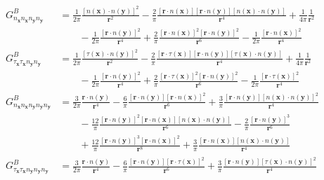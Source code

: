 \documentclass[preprint,12pt,3p]{elsarticle}
\begin{document}
\begin{align}
    G^{B}_{n_\mathbf{x} n_\mathbf{x} n_\mathbf{y} n_\mathbf{y}} &= \frac{1}{2\pi} \frac{[n(\mathbf{x})\cdot n(\mathbf{y})]^2}{\pmb{r}^2} - \frac{2}{\pi} \frac{[\pmb{r}\cdot n(\mathbf{x})][\pmb{r} \cdot n(\mathbf{y})][n(\mathbf{x})\cdot n(\mathbf{y})]}{\pmb{r}^4} + \frac{1}{4\pi} \frac{1}{\pmb{r}^2} \nonumber \\
    &\qquad -\frac{1}{2\pi}\frac{[\pmb{r}\cdot n(\mathbf{y})]^2}{\pmb{r}^4} + \frac{2}{\pi} \frac{[\pmb{r}\cdot n(\mathbf{x})]^2[\pmb{r}\cdot n(\mathbf{y})]^2}{\pmb{r}^6} - \frac{1}{2\pi} \frac{[\pmb{r}\cdot n(\mathbf{x})]^2}{\pmb{r}^4}  \\
    G^{B}_{\tau_\mathbf{x} \tau_\mathbf{x} n_\mathbf{y} n_\mathbf{y}} &= \frac{1}{2\pi} \frac{[\tau(\mathbf{x})\cdot n(\mathbf{y})]^2}{\pmb{r}^2} - \frac{2}{\pi} \frac{[\pmb{r}\cdot \tau(\mathbf{x})][\pmb{r} \cdot n(\mathbf{y})][\tau(\mathbf{x})\cdot n(\mathbf{y})]}{\pmb{r}^4} + \frac{1}{4\pi} \frac{1}{\pmb{r}^2} \nonumber \\
    &\qquad -\frac{1}{2\pi}\frac{[\pmb{r}\cdot n(\mathbf{y})]^2}{\pmb{r}^4} + \frac{2}{\pi} \frac{[\pmb{r}\cdot \tau(\mathbf{x})]^2[\pmb{r}\cdot n(\mathbf{y})]^2}{\pmb{r}^6} - \frac{1}{2\pi} \frac{[\pmb{r}\cdot \tau(\mathbf{x})]^2}{\pmb{r}^4}  \\
  G^B_{n_{\mathbf{x}} n_{\mathbf{x}} n_{\mathbf{y}} n_{\mathbf{y}} n_{\mathbf{y}}} &= \frac{3}{2 \pi} \frac{\pmb{r} \cdot n(\mathbf{y})}{\pmb{r}^4} - \frac{6}{\pi} \frac{[\pmb{r} \cdot n(\mathbf{y})][\pmb{r}\cdot n(\mathbf{x})]^2}{\pmb{r}^6} + \frac{3}{\pi} \frac{[\pmb{r} \cdot n(\mathbf{y})][n(\mathbf{x}) \cdot n(\mathbf{y})]^2}{\pmb{r}^4} \nonumber \\
    &\qquad - \frac{12}{\pi} \frac{[\pmb{r}\cdot n(\mathbf{y})]^2 [\pmb{r} \cdot n( \mathbf{x}) ][n(\mathbf{x}) \cdot n(\mathbf{y})]}{\pmb{r}^6} - \frac{2}{\pi} \frac{[\pmb{r} \cdot n(\mathbf{y})]^3}{\pmb{r}^6} \nonumber \\
    &\qquad + \frac{12}{\pi} \frac{[\pmb{r} \cdot n(\mathbf{y})]^3 [\pmb{r}\cdot n(\mathbf{x})]^2}{\pmb{r}^8} + \frac{3}{\pi} \frac{[\pmb{r}\cdot n(\mathbf{x})][n(\mathbf{x}) \cdot n(\mathbf{y})]}{\pmb{r}^4} \label{Gnxnxnynyny} \\
    G^B_{\tau_{\mathbf{x}} \tau_{\mathbf{x}} n_{\mathbf{y}} n_{\mathbf{y}} n_{\mathbf{y}}} &= \frac{3}{2 \pi} \frac{\pmb{r} \cdot n(\mathbf{y})}{\pmb{r}^4} - \frac{6}{\pi} \frac{[\pmb{r} \cdot n(\mathbf{y})][\pmb{r}\cdot \tau(\mathbf{x})]^2}{\pmb{r}^6} + \frac{3}{\pi} \frac{[\pmb{r} \cdot n(\mathbf{y})][\tau(\mathbf{x}) \cdot n(\mathbf{y})]^2}{\pmb{r}^4} \nonumber \\

\end{align}
\end{document}
